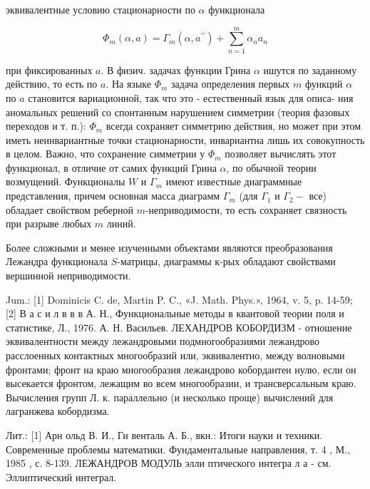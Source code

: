 \documentclass[10pt]{article}
\begin{document}
эквивалентные условию стационарности по $\alpha$ функционала



\[

\Phi_{m}(\alpha, a)=\Gamma_{m}\left(\alpha, a^{\prime \prime}\right)+\sum_{n=1}^{m} \alpha_{n} a_{n}

\]



при фиксированных $a$. В физич. задачах функции Грина $\alpha$ ишутся по заданному действию, то есть по $a$. На языке $\Phi_{m}$ задача определения первых $m$ функций $\alpha$ по $a$ становится вариационной, так что это - естественный язык для описа- ния аномальных решений со спонтанным нарушением симметрии (теория фазовых переходов и т. п.): $\Phi_{m}$ всегда сохраняет симметрию действия, но может при этом иметь неинвариантные точки стационарности, инвариантна лишь их совокупность в целом. Важно, что сохранение симметрии у $\Phi_{m}$ позволяет вычислять этот функционал, в отличие от самих функций Грина $\alpha$, по обычной теории возмущений. Функционалы $W$ и $\Gamma_{m}$ имеют известные диаграммные представления, причем основная масса диаграмм $\Gamma_{m}$ (для $\Gamma_{1}$ и $\Gamma_{2}-$ все) обладает свойством реберной $m$-неприводимости, то есть сохраняет связность при разрыве любых $m$ линий.



Более сложными и менее изученными объектами являются преобразования Лежандра функционала $S$-матрицы, диаграммы к-рых обладают свойствами вершинной неприводимости.



Jum.: [1] Dominicis C. de, Martin P. C., «J. Math. Phys.», 1964, v. 5, p. 14-59; [2] В а с и л в в в А. Н., Функциональные методы в квантовой теории поля и статистике, Л., 1976. А. Н. Васильев. ЛЕХАНДРОВ КОБОРДИЗМ - отношение эквивалентности между лежандровыми подмногообразиями лежандрово расслоенных контактных многообразий или, эквивалентно, между волновыми фронтами; фронт на краю многообразия лежандрово кобордантен нулю, если он высекается фронтом, лежащим во всем многообразии, и трансверсальным краю. Вычисления групп Л. к. параллельно (и несколько проще) вычислений для лагранжева кобордизма.



Лит.: [1] Арн ольд В. И., Ги венталь А. Б., вкн.: Итоги науки и техники. Современные проблемы математики. Фундаментальные направления, т. 4 , М., 1985 , с. 8-139. ЛЕЖАНДРОВ МОДУЛЬ элли птического интегра л а - см. Эллиптический интеграл.
\end{document}
